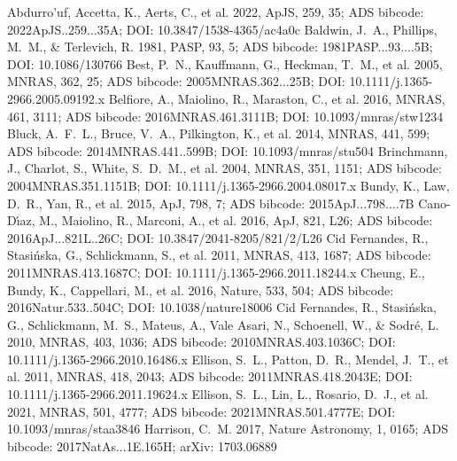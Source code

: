 \documentclass[twocolumn]{aastex631}
\begin{document}
\begin{thebibliography}{}
 Abdurro'uf, Accetta, K., Aerts, C., et al. 2022, ApJS, 259, 35; ADS bibcode: 2022ApJS..259...35A; DOI: 10.3847/1538-4365/ac4a0c
 Baldwin, J.~A., Phillips, M.~M., \& Terlevich, R. 1981, PASP, 93, 5; ADS bibcode: 1981PASP...93....5B; DOI: 10.1086/130766
 Best, P.~N., Kauffmann, G., Heckman, T.~M., et al. 2005, MNRAS, 362, 25; ADS bibcode: 2005MNRAS.362...25B; DOI: 10.1111/j.1365-2966.2005.09192.x
 Belfiore, A., Maiolino, R., Maraston, C., et al. 2016, MNRAS, 461, 3111; ADS bibcode: 2016MNRAS.461.3111B; DOI: 10.1093/mnras/stw1234
 Bluck, A.~F.~L., Bruce, V.~A., Pilkington, K., et al. 2014, MNRAS, 441, 599; ADS bibcode: 2014MNRAS.441..599B; DOI: 10.1093/mnras/stu504
 Brinchmann, J., Charlot, S., White, S.~D.~M., et al. 2004, MNRAS, 351, 1151; ADS bibcode: 2004MNRAS.351.1151B; DOI: 10.1111/j.1365-2966.2004.08017.x
 Bundy, K., Law, D.~R., Yan, R., et al. 2015, ApJ, 798, 7; ADS bibcode: 2015ApJ...798....7B
 Cano-D\'{\i}az, M., Maiolino, R., Marconi, A., et al. 2016, ApJ, 821, L26; ADS bibcode: 2016ApJ...821L..26C; DOI: 10.3847/2041-8205/821/2/L26
 Cid Fernandes, R., Stasi{\'n}ska, G., Schlickmann, S., et al. 2011, MNRAS, 413, 1687; ADS bibcode: 2011MNRAS.413.1687C; DOI: 10.1111/j.1365-2966.2011.18244.x
 Cheung, E., Bundy, K., Cappellari, M., et al. 2016, Nature, 533, 504; ADS bibcode: 2016Natur.533..504C; DOI: 10.1038/nature18006
 Cid Fernandes, R., Stasi{\'n}ska, G., Schlickmann, M.~S., Mateus, A., Vale Asari, N., Schoenell, W., \& Sodr{\'e}, L. 2010, MNRAS, 403, 1036; ADS bibcode: 2010MNRAS.403.1036C; DOI: 10.1111/j.1365-2966.2010.16486.x
 Ellison, S.~L., Patton, D.~R., Mendel, J.~T., et al. 2011, MNRAS, 418, 2043; ADS bibcode: 2011MNRAS.418.2043E; DOI: 10.1111/j.1365-2966.2011.19624.x
 Ellison, S.~L., Lin, L., Rosario, D.~J., et al. 2021, MNRAS, 501, 4777; ADS bibcode: 2021MNRAS.501.4777E; DOI: 10.1093/mnras/staa3846
 Harrison, C.~M. 2017, Nature Astronomy, 1, 0165; ADS bibcode: 2017NatAs...1E.165H; arXiv: 1703.06889

\end{thebibliography}
\end{document}
